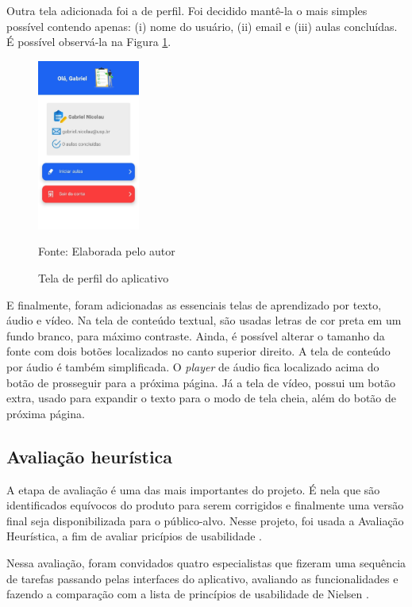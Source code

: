 Outra tela adicionada foi a de perfil. Foi decidido mantê-la o mais simples possível contendo apenas: (i) nome do usuário, (ii) email e (iii) aulas concluídas. É possível observá-la na Figura \ref{fig:perfil}.

\begin{figure}[H]
\centering
    \caption{Tela de perfil do aplicativo}
    \label{fig:perfil}
    \includegraphics[width=0.3\textwidth]{Figuras/profile.jpg}
    
    Fonte: Elaborada pelo autor
\end{figure}

E finalmente, foram adicionadas as essenciais telas de aprendizado por texto, áudio e vídeo.
Na tela de conteúdo textual, são usadas letras de cor preta em um fundo branco, para máximo contraste. Ainda, é possível alterar o tamanho da fonte com dois botões localizados no canto superior direito.
A tela de conteúdo por áudio é também simplificada. O \textit{player} de áudio fica localizado acima do botão de prosseguir para a próxima página.
Já a tela de vídeo, possui um botão extra, usado para expandir o texto para o modo de tela cheia, além do botão de próxima página. 

\subsection{Avaliação heurística}
\label{sec:avaliacao-heuristica}
A etapa de avaliação é uma das mais importantes do projeto. É nela que são identificados equívocos do produto para serem corrigidos e finalmente uma versão final seja disponibilizada para o público-alvo. Nesse projeto, foi usada a Avaliação Heurística, a fim de avaliar pricípios de usabilidade \citep{nielsen1994inspection}.

Nessa avaliação, foram convidados quatro especialistas que fizeram uma sequência de tarefas passando pelas interfaces do aplicativo, avaliando as funcionalidades e fazendo a comparação com a lista de princípios de usabilidade de Nielsen \citep{nielsen1994usability}.


